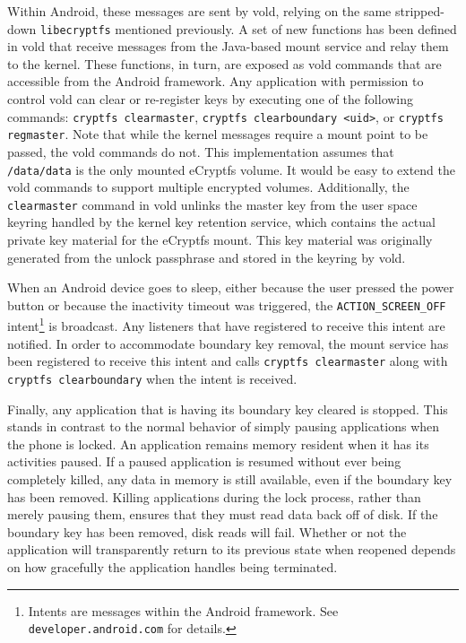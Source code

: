 Within Android, these messages are sent by vold, relying on the same stripped-down \texttt{libecryptfs} mentioned
previously.  A set of new functions has been defined in vold that receive messages from the Java-based mount service and
relay them to the kernel. These functions, in turn, are exposed as vold commands that are accessible from the Android
framework. Any application with permission to control vold can clear or re-register keys by executing one of the following
commands: \texttt{cryptfs clearmaster}, \texttt{cryptfs clearboundary <uid>}, or \texttt{cryptfs regmaster}. Note that while the
kernel messages require a mount point to be passed, the vold commands do not. This implementation assumes that
\texttt{/data/data} is the only mounted eCryptfs volume. It would be easy to extend the vold commands to support
multiple encrypted volumes. Additionally, the \texttt{clearmaster} command in vold unlinks the master key from the
user space keyring
handled by the kernel key retention service, which contains the actual private key material for the eCryptfs mount. This key
material was originally generated from the unlock passphrase and stored in the keyring by vold.

When an Android device goes to sleep, either because the user pressed the power button or because the inactivity timeout was
triggered, the \texttt{ACTION\_SCREEN\_OFF} intent\footnote{Intents are messages within the Android framework. See
\texttt{developer.android.com} for details.} is broadcast. Any listeners that have registered to receive this intent are notified.
In order to accommodate boundary key removal, the mount service has been registered to receive this intent and calls \texttt{cryptfs
clearmaster} along with \texttt{cryptfs clearboundary} when the intent is received. 

Finally, any application that is having its boundary key cleared is stopped. This stands in contrast to the normal behavior
of simply pausing applications when the phone is locked. An application remains memory resident when it has its activities paused.
If a paused application is resumed without ever being completely killed, any data in memory is still available, even if the boundary key
has been removed. Killing applications during the lock process, rather than merely pausing them, ensures that they must
read data back off of disk. If the boundary key has been removed, disk reads will fail. Whether or not the application will
transparently return to its previous state when reopened depends on how gracefully the application handles being terminated. 

